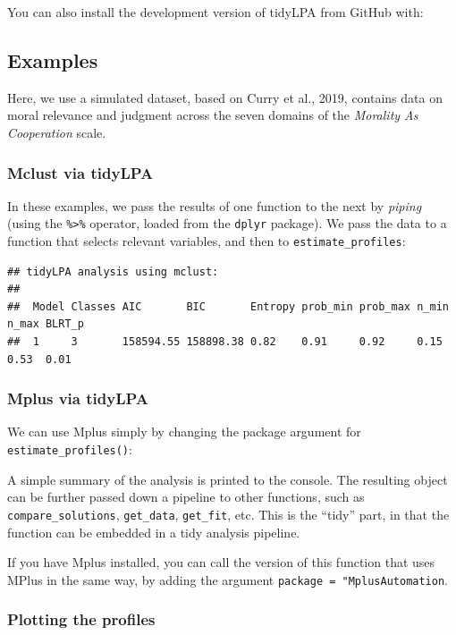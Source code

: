 \documentclass[man]{apa6}
\begin{document}
You can also install the development version of tidyLPA from GitHub with:

\hypertarget{examples}{%
\subsection{Examples}\label{examples}}

Here, we use a simulated dataset, based on Curry et al., 2019, contains data on moral relevance and judgment across the seven domains of the \emph{Morality As Cooperation} scale.

\hypertarget{mclust-via-tidylpa}{%
\subsubsection{Mclust via tidyLPA}\label{mclust-via-tidylpa}}

In these examples, we pass the results of one function to the next by \emph{piping}
(using the \texttt{\%\textgreater{}\%} operator, loaded from the \texttt{dplyr} package). We pass the data to
a function that selects relevant variables, and then to \texttt{estimate\_profiles}:

\begin{verbatim}
## tidyLPA analysis using mclust: 
## 
##  Model Classes AIC       BIC       Entropy prob_min prob_max n_min n_max BLRT_p
##  1     3       158594.55 158898.38 0.82    0.91     0.92     0.15  0.53  0.01
\end{verbatim}

\hypertarget{mplus-via-tidylpa}{%
\subsubsection{Mplus via tidyLPA}\label{mplus-via-tidylpa}}

We can use Mplus simply by changing the package argument for
\texttt{estimate\_profiles()}:

A simple summary of the analysis is printed to the console.
The resulting object can be further passed down a pipeline to
other functions, such as \texttt{compare\_solutions}, \texttt{get\_data}, \texttt{get\_fit},
etc. This is the ``tidy'' part, in that the function can be embedded in a tidy
analysis pipeline.

If you have Mplus installed, you can call the version of this function that uses
MPlus in the same way, by adding the argument \texttt{package\ =\ "MplusAutomation}.

\hypertarget{plotting-the-profiles}{%
\subsubsection{Plotting the profiles}\label{plotting-the-profiles}}
\end{document}
